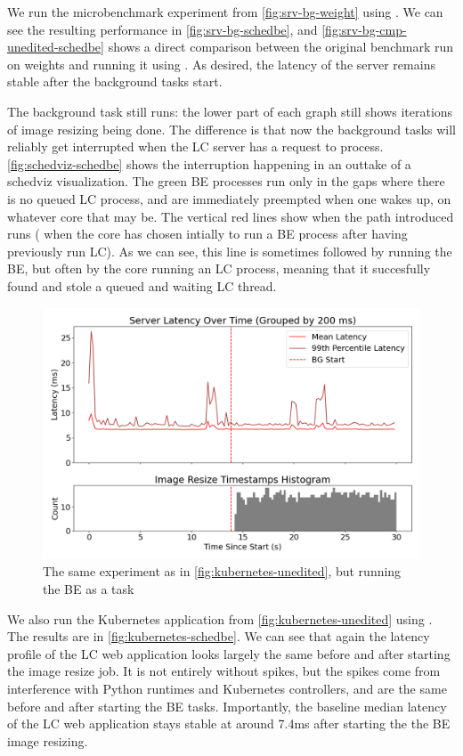 We run the microbenchmark experiment from \autoref{fig:srv-bg-weight} using
\schedbe{}. We can see the resulting performance in
\autoref{fig:srv-bg-schedbe}, and \autoref{fig:srv-bg-cmp-unedited-schedbe}
shows a direct comparison between the original benchmark run on \cgroups{}
weights and running it using \schedbe{}. As desired, the latency of the server
remains stable after the background tasks start. 

The background task still runs: the lower part of each graph still shows
iterations of image resizing being done. The difference is that now the
background tasks will reliably get interrupted when the LC server has a request
to process. \autoref{fig:schedviz-schedbe} shows the interruption happening in
an outtake of a schedviz visualization. The green BE processes run only in the
gaps where there is no queued LC process, and are immediately preempted when one
wakes up, on whatever core that may be. The vertical red lines show when the
\exit{} path \schedbe{} introduced runs (\ie{} when the core has chosen intially
to run a BE process after having previously run LC). As we can see, this line is
sometimes followed by running the BE, but often by the core running an LC
process, meaning that it succesfully found and stole a queued and waiting LC
thread.

\begin{figure}[t]
    \centering
    \includegraphics[width=\columnwidth]{graphs/kubernetes-schedbe.png}
    \caption{The same experiment as in \autoref{fig:kubernetes-unedited}, but
    running the BE as a \schedbe{} task}\label{fig:kubernetes-schedbe}
\end{figure}

We also run the Kubernetes application from \autoref{fig:kubernetes-unedited}
using \schedbe{}. The results are in \autoref{fig:kubernetes-schedbe}. We can
see that again the latency profile of the LC web application looks largely the
same before and after starting the image resize job. It is not entirely without spikes, but the spikes come
from interference with Python runtimes and Kubernetes controllers, and are the
same before and after starting the BE tasks. Importantly, the baseline median
latency of the LC web application stays stable at around 7.4ms after starting
the the BE image resizing. 

